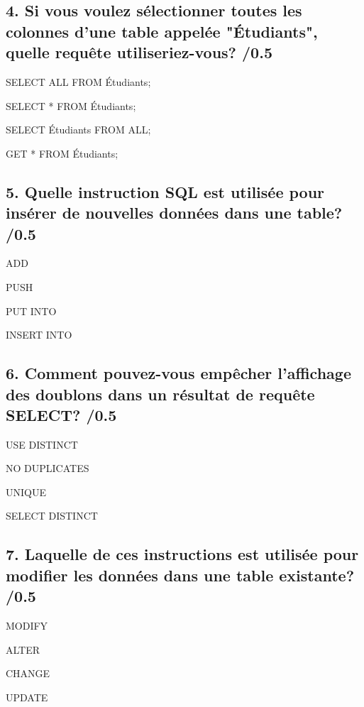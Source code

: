 \documentclass[12pt,a4paper]{article}
\begin{document}
\begin{flushleft}
\subsection*{4. Si vous voulez sélectionner toutes les colonnes d'une table appelée "Étudiants", quelle requête utiliseriez-vous? /0.5}
\begin{choices}
    \item SELECT ALL FROM Étudiants;
    \item SELECT * FROM Étudiants;
    \item SELECT Étudiants FROM ALL;
    \item GET * FROM Étudiants;
\end{choices}

\subsection*{5. Quelle instruction SQL est utilisée pour insérer de nouvelles données dans une table? /0.5}
\begin{choices}
    \item ADD
    \item PUSH
    \item PUT INTO
    \item INSERT INTO
\end{choices}

\subsection*{6. Comment pouvez-vous empêcher l'affichage des doublons dans un résultat de requête SELECT? /0.5}
\begin{choices}
    \item USE DISTINCT
    \item NO DUPLICATES
    \item UNIQUE
    \item SELECT DISTINCT
\end{choices}

\subsection*{7. Laquelle de ces instructions est utilisée pour modifier les données dans une table existante? /0.5}
\begin{choices}
    \item MODIFY
    \item ALTER
    \item CHANGE
    \item UPDATE
\end{choices}


\end{flushleft}
\end{document}
